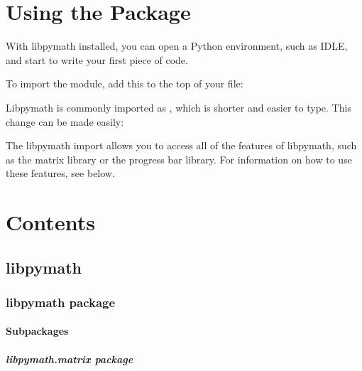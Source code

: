 \documentclass[letterpaper,10pt,english]{sphinxmanual}
\begin{document}
\chapter{Using the Package}
\label{\detokenize{index:using-the-package}}
With libpymath installed, you can open a Python environment, such as IDLE, and start to write your first piece of code.

To import the module, add this to the top of your file:

\begin{sphinxVerbatim}[commandchars=\\\{\}]
 
\end{sphinxVerbatim}

Libpymath is commonly imported as , which is shorter and easier to type. This change can be made easily:

\begin{sphinxVerbatim}[commandchars=\\\{\}]
   
\end{sphinxVerbatim}

The libpymath import allows you to access all of the features of libpymath, such as the matrix library or the progress bar library. For information on how to use these features, see below.


\chapter{Contents}
\label{\detokenize{index:contents}}

\section{libpymath}
\label{\detokenize{modules:libpymath}}\label{\detokenize{modules::doc}}

\subsection{libpymath package}
\label{\detokenize{libpymath:libpymath-package}}\label{\detokenize{libpymath::doc}}

\subsubsection{Subpackages}
\label{\detokenize{libpymath:subpackages}}

\paragraph{libpymath.matrix package}
\label{\detokenize{libpymath.matrix:libpymath-matrix-package}}\label{\detokenize{libpymath.matrix::doc}}
\end{document}
